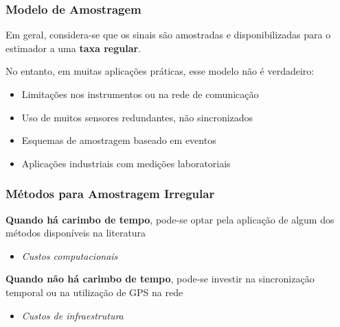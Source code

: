 \documentclass{beamer}
\renewcommand{\(}{\left(}
\renewcommand{\)}{\right)}
\renewcommand{\[}{\left[}
\renewcommand{\]}{\right]}
\begin{document}

\begin{frame}
	\frametitle{Modelo de Amostragem}
	
	Em geral, considera-se que os sinais são amostradas e disponibilizadas para o estimador a uma \textbf{taxa regular}.
	
	\vspace{0.5cm}
	
	No entanto, em muitas aplicações práticas, esse modelo não é verdadeiro:
	
	\begin{itemize}
		\item<2-> Limitações nos instrumentos ou na rede de comunicação
		\item<3-> Uso de muitos sensores redundantes, não sincronizados	
		\item<4-> Esquemas de amostragem baseado em eventos
		\item<5-> Aplicações industriais com medições laboratoriais
	\end{itemize}

\end{frame}


\begin{frame}
	\frametitle{Métodos para Amostragem Irregular}
	
	\textbf{Quando há carimbo de tempo}, pode-se optar pela aplicação de algum dos métodos disponíveis na literatura
	\begin{itemize}
		\item \textit{Custos computacionais}
	\end{itemize}
	
	\vspace{0.5cm}
	
	\textbf{Quando não há carimbo de tempo}, pode-se investir na sincronização temporal ou na utilização de GPS na rede
	\begin{itemize}
		\item \textit{Custos de infraestrutura}
	\end{itemize}

\end{frame}

\end{document}
